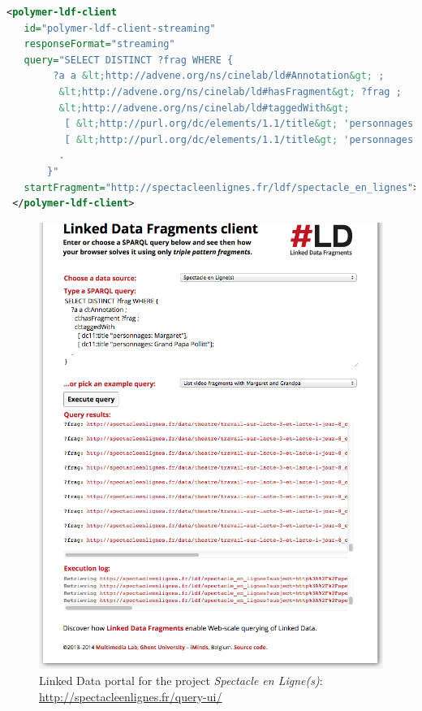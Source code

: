 \documentclass[runningheads,a4paper]{llncs}
\begin{document}
\begin{lstlisting}[caption={Linked Data Fragments Web Component \texttt{<polymer-ldf-client>}},
  label=listing:ldfclient, language=XML,
  float=htb, showstringspaces=false, stringstyle=\color{gray},morekeywords={polymer,ldf,id,client,responseFormat,query,startFragment}]
<polymer-ldf-client
   id="polymer-ldf-client-streaming"
   responseFormat="streaming"
   query="SELECT DISTINCT ?frag WHERE {
        ?a a &lt;http://advene.org/ns/cinelab/ld#Annotation&gt; ;
         &lt;http://advene.org/ns/cinelab/ld#hasFragment&gt; ?frag ;
         &lt;http://advene.org/ns/cinelab/ld#taggedWith&gt;
          [ &lt;http://purl.org/dc/elements/1.1/title&gt; 'personnages: Margaret'],
          [ &lt;http://purl.org/dc/elements/1.1/title&gt; 'personnages: Grand Papa Pollitt'];
         .
       }"
   startFragment="http://spectacleenlignes.fr/ldf/spectacle_en_lignes">
 </polymer-ldf-client>
\end{lstlisting}

\begin{figure}[hbt]
  \centering
  \includegraphics[width=1\textwidth]{linkeddatafragments.png}
  \caption{Linked Data portal for the project \emph{Spectacle en Ligne(s)}: \url{http://spectacleenlignes.fr/query-ui/}}
  \label{fig:ldf}
\end{figure}
\end{document}
